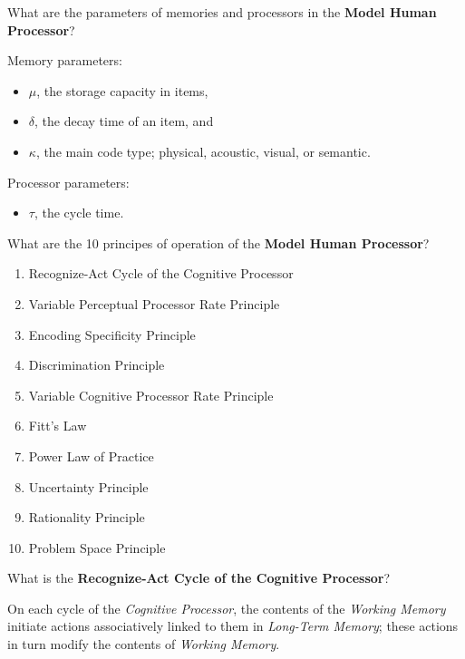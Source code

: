 \begin{flashcard}[Question]{What are the parameters of memories and processors in the \textbf{Model Human Processor}?}
\begin{center}
Memory parameters:
\begin{itemize}
\item $\mu$, the storage capacity in items,
\item $\delta$, the decay time of an item, and
\item $\kappa$, the main code type; physical, acoustic, visual, or semantic.
\end{itemize}
Processor parameters:
\begin{itemize}
\item $\tau$, the cycle time.
\end{itemize}
\end{center}
\end{flashcard}

\begin{flashcard}[Question]{What are the 10 principes of operation of the \textbf{Model Human Processor}?}
{\small
\begin{enumerate}[start=0,label=\textbf{P\arabic*.}]
\item Recognize-Act Cycle of the Cognitive Processor
\item Variable Perceptual Processor Rate Principle
\item Encoding Specificity Principle
\item Discrimination Principle
\item Variable Cognitive Processor Rate Principle
\item Fitt's Law
\item Power Law of Practice
\item Uncertainty Principle
\item Rationality Principle
\item Problem Space Principle
\end{enumerate}
}
\end{flashcard}

\begin{flashcard}[Question]{What is the \textbf{Recognize-Act Cycle of the Cognitive Processor}?}
\begin{center}
On each cycle of the \textit{Cognitive Processor}, the contents of the \textit{Working Memory} initiate actions associatively linked to them in \textit{Long-Term Memory}; these actions in turn modify the contents of \textit{Working Memory}.
\end{center}
\end{flashcard}

